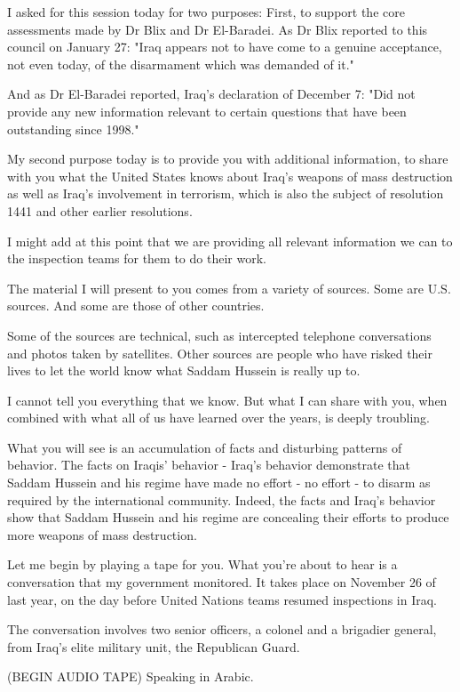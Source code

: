\documentclass[10pt,a4paper]{article}
\begin{document}
I asked for this session today for two purposes: First, to support the core assessments made by Dr Blix and Dr El-Baradei. As Dr Blix reported to this council on January 27: "Iraq appears not to have come to a genuine acceptance, not even today, of the disarmament which was demanded of it."

And as Dr El-Baradei reported, Iraq's declaration of December 7: "Did not provide any new information relevant to certain questions that have been outstanding since 1998."

My second purpose today is to provide you with additional information, to share with you what the United States knows about Iraq's weapons of mass destruction as well as Iraq's involvement in terrorism, which is also the subject of resolution 1441 and other earlier resolutions.

I might add at this point that we are providing all relevant information we can to the inspection teams for them to do their work.

The material I will present to you comes from a variety of sources. Some are U.S. sources. And some are those of other countries.

Some of the sources are technical, such as intercepted telephone conversations and photos taken by satellites. Other sources are people who have risked their lives to let the world know what Saddam Hussein is really up to.

I cannot tell you everything that we know. But what I can share with you, when combined with what all of us have learned over the years, is deeply troubling.

What you will see is an accumulation of facts and disturbing patterns of behavior. The facts on Iraqis' behavior - Iraq's behavior demonstrate that Saddam Hussein and his regime have made no effort - no effort - to disarm as required by the international community. Indeed, the facts and Iraq's behavior show that Saddam Hussein and his regime are concealing their efforts to produce more weapons of mass destruction.

Let me begin by playing a tape for you. What you're about to hear is a conversation that my government monitored. It takes place on November 26 of last year, on the day before United Nations teams resumed inspections in Iraq.

The conversation involves two senior officers, a colonel and a brigadier general, from Iraq's elite military unit, the Republican Guard.

(BEGIN AUDIO TAPE) Speaking in Arabic.
\end{document}
